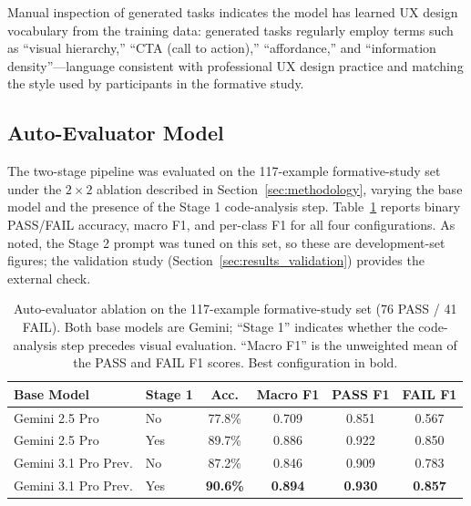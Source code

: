 \documentclass[sigconf,nonacm]{acmart}
\begin{document}
Manual inspection of generated tasks indicates the model has learned UX design vocabulary from the training data: generated tasks regularly employ terms such as ``visual hierarchy,'' ``CTA (call to action),'' ``affordance,'' and ``information density''—language consistent with professional UX design practice and matching the style used by participants in the formative study.

\subsection{Auto-Evaluator Model}
\label{sec:results_evaluator}

The two-stage pipeline was evaluated on the 117-example formative-study set under the $2\times2$ ablation described in Section~\ref{sec:methodology}, varying the base model and the presence of the Stage 1 code-analysis step. Table~\ref{tab:ablation} reports binary PASS/FAIL accuracy, macro F1, and per-class F1 for all four configurations. As noted, the Stage 2 prompt was tuned on this set, so these are development-set figures; the validation study (Section~\ref{sec:results_validation}) provides the external check.

\begin{table}[t]
\centering
\small
\setlength{\tabcolsep}{4pt}
\caption{Auto-evaluator ablation on the 117-example formative-study set (76 PASS / 41 FAIL). Both base models are Gemini; ``Stage 1'' indicates whether the code-analysis step precedes visual evaluation. ``Macro F1'' is the unweighted mean of the PASS and FAIL F1 scores. Best configuration in bold.}
\label{tab:ablation}
\begin{tabular}{llcccc}
\toprule
\textbf{Base Model} & \textbf{Stage 1} & \textbf{Acc.} & \textbf{Macro F1} & \textbf{PASS F1} & \textbf{FAIL F1} \\
\midrule
Gemini 2.5 Pro          & No  & 77.8\% & 0.709 & 0.851 & 0.567 \\
Gemini 2.5 Pro          & Yes & 89.7\% & 0.886 & 0.922 & 0.850 \\
Gemini 3.1 Pro Prev.    & No  & 87.2\% & 0.846 & 0.909 & 0.783 \\
Gemini 3.1 Pro Prev.    & Yes & \textbf{90.6\%} & \textbf{0.894} & \textbf{0.930} & \textbf{0.857} \\
\bottomrule
\end{tabular}
\end{table}
\end{document}
